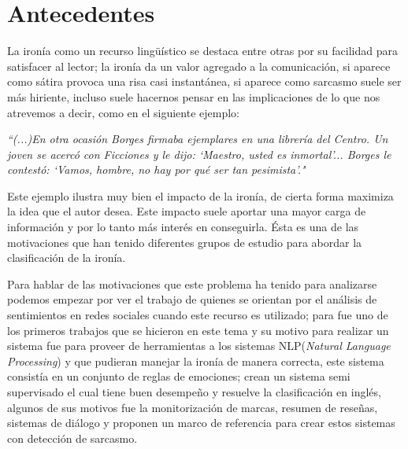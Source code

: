 \chapter{Antecedentes}\label{cap.antecedentes}

\par La ironía como un recurso lingüístico se destaca entre otras por su facilidad para satisfacer al lector; la ironía da un valor agregado a la comunicación, si aparece como sátira provoca una risa casi instantánea, si aparece como sarcasmo suele ser más hiriente, incluso suele hacernos pensar en las implicaciones de lo que nos atrevemos a decir, como en el siguiente ejemplo:

\begin{center}
	\textit{``(...)En otra ocasión Borges firmaba ejemplares en una librería del Centro. Un joven se acercó con Ficciones y le dijo: `Maestro, usted es inmortal'... Borges le contestó: `Vamos, hombre, no hay por qué ser tan pesimista'."} \cite{Sergio2012}
	\vspace{5pt}
\end{center}
\vspace{5pt}

\par Este ejemplo ilustra muy bien el impacto de la ironía, de cierta forma maximiza la idea que el autor desea. Este impacto suele aportar una mayor carga de información y por lo tanto más interés en conseguirla. Ésta es una de las motivaciones que han tenido diferentes grupos de estudio para abordar la clasificación de la ironía.

\par Para hablar de las motivaciones que este problema ha tenido para analizarse podemos empezar por ver el trabajo de \cite{maynard2014cares} quienes se orientan por el análisis de sentimientos en redes sociales cuando este recurso es utilizado; para \cite{utsumi1995interpret} fue uno de los primeros trabajos que se hicieron en este tema y su motivo para realizar un sistema fue para proveer de herramientas a los sistemas NLP(\textit{Natural Language Processing}) y que pudieran manejar la ironía de manera correcta, este sistema consistía en un conjunto de reglas de emociones; \cite{davidov2010semi} crean un sistema semi supervisado el cual tiene buen desempeño y resuelve la clasificación en inglés, algunos de sus motivos fue la monitorización de marcas, resumen de reseñas, sistemas de diálogo y proponen un marco de referencia para crear estos sistemas con detección de sarcasmo.
